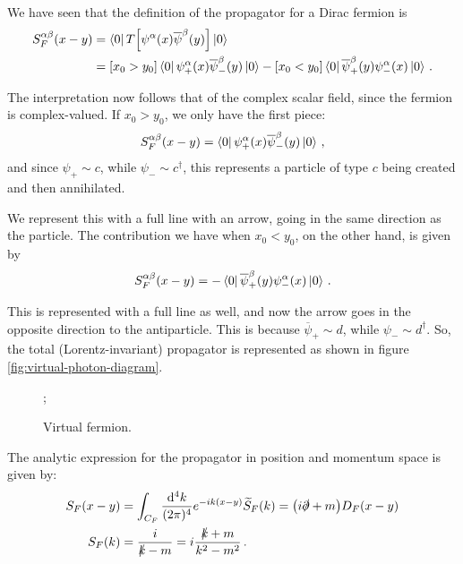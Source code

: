 \documentclass[main.tex]{subfiles}
\begin{document}
We have seen that the definition of the propagator for a Dirac fermion is 
%
\begin{subequations}
\begin{align}
S^{\alpha \beta }_{F}(x-y) 
&= \bra{0} T \qty[ \psi^{\alpha } (x) \overline{\psi}^{\beta }(y)] \ket{0}  \\
&= [x_0 > y_0 ]
\bra{0} \psi_{+}^{\alpha }(x) \overline{\psi}_{-}^{\beta } (y)\ket{0}
- [x_0 < y_0 ]
\bra{0} \overline{\psi}^{\beta }_{+}(y) \psi^{\alpha }_{-}(x) \ket{0}
\,.
\end{align}
\end{subequations}

The interpretation now follows that of the complex scalar field, since the fermion is complex-valued. 
If \(x_0 > y_0 \), we only have the first piece: 
%
\begin{align}
S^{\alpha \beta }_{F} (x-y) = \bra{0} \psi_{+}^{\alpha }(x) \overline{\psi}_{-}^{\beta } (y)\ket{0}
\,,
\end{align}
%
and since \(\psi_{+} \sim c\), while \(\psi_{-} \sim c ^\dag\), this represents a particle of type \(c\) being created and then annihilated.

We represent this with a full line with an arrow, going in the same direction as the particle.
The contribution we have when \(x_0 < y_0 \), on the other hand, is given by 
%
\begin{align}
S^{\alpha \beta }_{F}(x- y) = 
- \bra{0} \overline{\psi}^{\beta }_{+}(y) \psi^{\alpha }_{-}(x) \ket{0}
\,.
\end{align}

This is represented with a full line as well, and now the arrow goes in the opposite direction to the antiparticle. This is because \(\overline{\psi}_{+} \sim d\), while \(\psi_{-} \sim d ^\dag\). So, the total (Lorentz-invariant) propagator is represented as shown in figure \ref{fig:virtual-photon-diagram}.

\begin{figure}[ht]
\centering
{};
\caption{Virtual fermion.}
\label{fig:virtual-fermion-diagram}
\end{figure}

The analytic expression for the propagator in position and momentum space is given by: 
%
\begin{subequations}
\begin{align}
S_F (x-y) &= \int_{C_F} \frac{ \dd[4]{k}}{(2 \pi )^{4}} e^{-ik (x-y)}
\widetilde{S}_{F} (k) = \qty(i \slashed{\partial} + m )D_F(x-y) \\
S_F (k) &= \frac{i}{\slashed{k} - m} = i \frac{\slashed{k} + m }{k^2- m^2} \label{eq:fermion-propagator-momentum-space-explicit}
\,.
\end{align}
\end{subequations}
\end{document}
